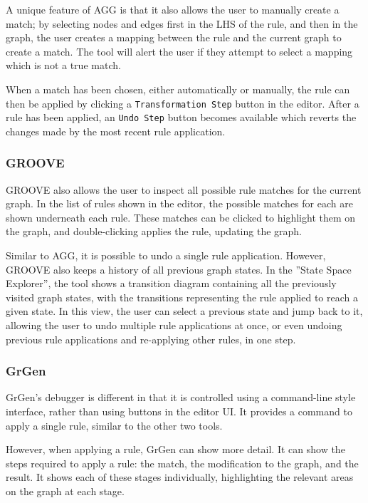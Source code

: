 \documentclass[authoryearcitations]{UoYCSproject}
\begin{document}
A unique feature of AGG is that it also allows the user to manually create a
match; by selecting nodes and edges first in the LHS of the rule, and then in
the graph, the user creates a mapping between the rule and the current graph to
create a match. The tool will alert the user if they attempt to select a mapping
which is not a true match.

When a match has been chosen, either automatically or manually, the rule can then
be applied by clicking a \texttt{Transformation Step} button in the editor. After
a rule has been applied, an \texttt{Undo Step} button becomes available which
reverts the changes made by the most recent rule application.

\subsubsection{GROOVE}

GROOVE also allows the user to inspect all possible rule matches for the current
graph. In the list of rules shown in the editor, the possible matches for each are
shown underneath each rule. These matches can be clicked to highlight them on the
graph, and double-clicking applies the rule, updating the graph.

Similar to AGG, it is possible to undo a single rule application. However, GROOVE
also keeps a history of all previous graph states. In the ''State Space Explorer'',
the tool shows a transition diagram containing all the previously visited graph
states, with the transitions representing the rule applied to reach a given state.
In this view, the user can select a previous state and jump back to it, allowing
the user to undo multiple rule applications at once, or even undoing previous rule
applications and re-applying other rules, in one step.

\subsubsection{GrGen}

GrGen's debugger is different in that it is controlled using a command-line style
interface, rather than using buttons in the editor UI. It provides a command to
apply a single rule, similar to the other two tools.

However, when applying a rule, GrGen can show more detail. It can show the steps
required to apply a rule: the match, the modification to the graph, and the result.
It shows each of these stages individually, highlighting the relevant areas on the
graph at each stage.
\end{document}
